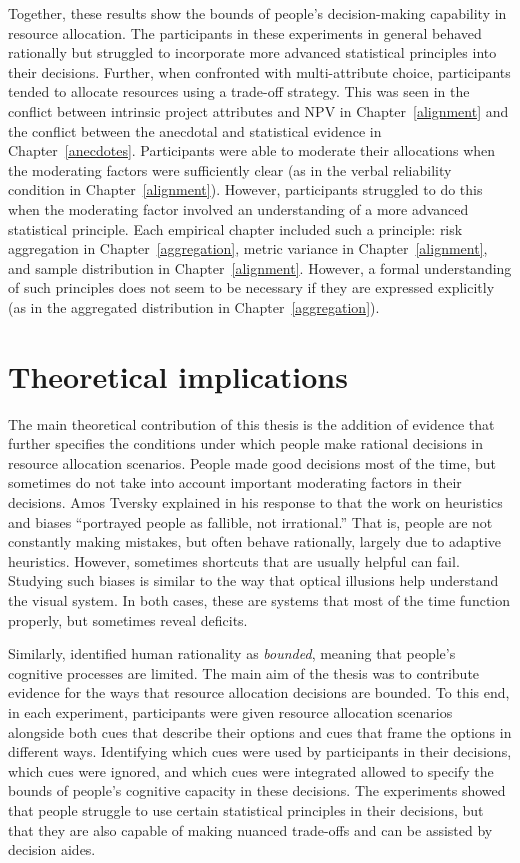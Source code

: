 \documentclass[a4paper, nobind, dvipsnames]{templates/ociamthesis}
\theoremstyle{definition}
\theoremstyle{definition}
\theoremstyle{definition}
\theoremstyle{definition}
\theoremstyle{remark}
\begin{document}
Together, these results show the bounds of people's decision-making capability
in resource allocation. The participants in these experiments in general behaved
rationally but struggled to incorporate more advanced statistical principles
into their decisions. Further, when confronted with multi-attribute choice,
participants tended to allocate resources using a trade-off strategy. This was
seen in the conflict between intrinsic project attributes and NPV in
Chapter~\ref{alignment} and the conflict between the anecdotal and statistical
evidence in Chapter~\ref{anecdotes}. Participants were able to moderate their
allocations when the moderating factors were sufficiently clear (as in the
verbal reliability condition in Chapter~\ref{alignment}). However, participants
struggled to do this when the moderating factor involved an understanding of a
more advanced statistical principle. Each empirical chapter included such a
principle: risk aggregation in Chapter~\ref{aggregation}, metric variance in
Chapter~\ref{alignment}, and sample distribution in Chapter~\ref{alignment}.
However, a formal understanding of such principles does not seem to be necessary
if they are expressed explicitly (as in the aggregated distribution in
Chapter~\ref{aggregation}).

\section{Theoretical implications}

The main theoretical contribution of this thesis is the addition of evidence
that further specifies the conditions under which people make rational decisions
in resource allocation scenarios. People made good decisions most of the time,
but sometimes do not take into account important moderating factors in their
decisions. Amos Tversky explained in his response to \textcite[p.~355]{cohen1981} that
the work on heuristics and biases ``portrayed people as fallible, not
irrational.'' That is, people are not constantly making mistakes, but often
behave rationally, largely due to adaptive heuristics. However, sometimes
shortcuts that are usually helpful can fail. Studying such biases is similar to
the way that optical illusions help understand the visual system. In both cases,
these are systems that most of the time function properly, but sometimes reveal
deficits.

Similarly, \textcite{simon1955} identified human rationality as \emph{bounded}, meaning that
people's cognitive processes are limited. The main aim of the thesis was to
contribute evidence for the ways that resource allocation decisions are bounded.
To this end, in each experiment, participants were given resource allocation
scenarios alongside both cues that describe their options and cues that frame
the options in different ways. Identifying which cues were used by participants
in their decisions, which cues were ignored, and which cues were integrated
allowed to specify the bounds of people's cognitive capacity in these decisions.
The experiments showed that people struggle to use certain statistical
principles in their decisions, but that they are also capable of making nuanced
trade-offs and can be assisted by decision aides.
\end{document}
